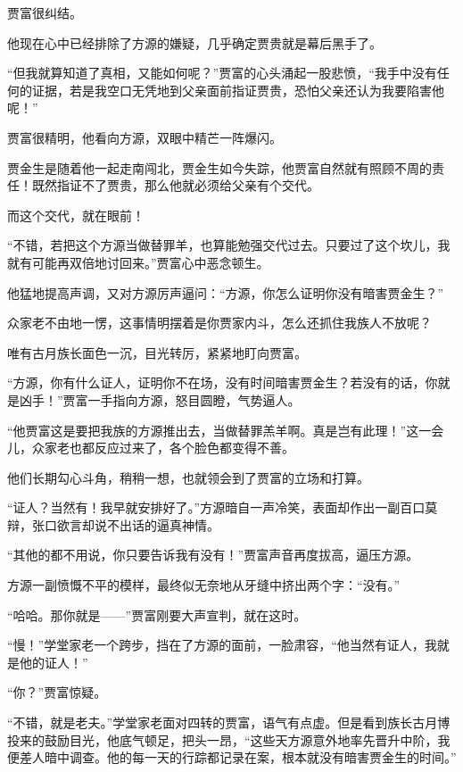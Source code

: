 
\begin{this_body}

贾富很纠结。

他现在心中已经排除了方源的嫌疑，几乎确定贾贵就是幕后黑手了。

“但我就算知道了真相，又能如何呢？”贾富的心头涌起一股悲愤，“我手中没有任何的证据，若是我空口无凭地到父亲面前指证贾贵，恐怕父亲还认为我要陷害他呢！”

贾富很精明，他看向方源，双眼中精芒一阵爆闪。

贾金生是随着他一起走南闯北，贾金生如今失踪，他贾富自然就有照顾不周的责任！既然指证不了贾贵，那么他就必须给父亲有个交代。

而这个交代，就在眼前！

“不错，若把这个方源当做替罪羊，也算能勉强交代过去。只要过了这个坎儿，我就有可能再双倍地讨回来。”贾富心中恶念顿生。

他猛地提高声调，又对方源厉声逼问：“方源，你怎么证明你没有暗害贾金生？”

众家老不由地一愣，这事情明摆着是你贾家内斗，怎么还抓住我族人不放呢？

唯有古月族长面色一沉，目光转厉，紧紧地盯向贾富。

“方源，你有什么证人，证明你不在场，没有时间暗害贾金生？若没有的话，你就是凶手！”贾富一手指向方源，怒目圆瞪，气势逼人。

“他贾富这是要把我族的方源推出去，当做替罪羔羊啊。真是岂有此理！”这一会儿，众家老也都反应过来了，各个脸色都变得不善。

他们长期勾心斗角，稍稍一想，也就领会到了贾富的立场和打算。

“证人？当然有！我早就安排好了。”方源暗自一声冷笑，表面却作出一副百口莫辩，张口欲言却说不出话的逼真神情。

“其他的都不用说，你只要告诉我有没有！”贾富声音再度拔高，逼压方源。

方源一副愤慨不平的模样，最终似无奈地从牙缝中挤出两个字：“没有。”

“哈哈。那你就是——”贾富刚要大声宣判，就在这时。

“慢！”学堂家老一个跨步，挡在了方源的面前，一脸肃容，“他当然有证人，我就是他的证人！”

“你？”贾富惊疑。

“不错，就是老夫。”学堂家老面对四转的贾富，语气有点虚。但是看到族长古月博投来的鼓励目光，他底气顿足，把头一昂，“这些天方源意外地率先晋升中阶，我便差人暗中调查。他的每一天的行踪都记录在案，根本就没有暗害贾金生的时间。”


\end{this_body}
